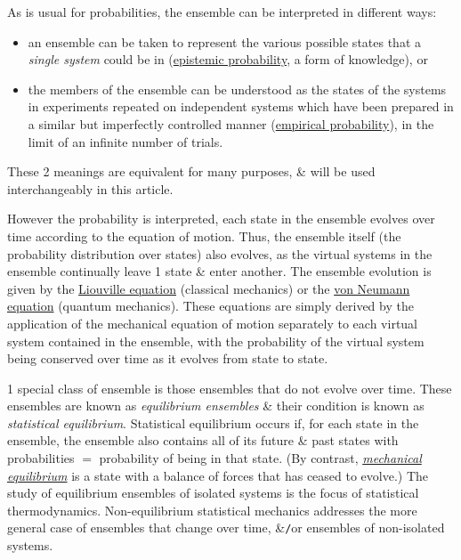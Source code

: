 \documentclass{article}
\begin{document}
As is usual for probabilities, the ensemble can be interpreted in different ways:
\begin{itemize}
	\item an ensemble can be taken to represent the various possible states that a {\it single system} could be in (\href{https://en.wikipedia.org/wiki/Epistemic_probability}{epistemic probability}, a form of knowledge), or
	\item the members of the ensemble can be understood as the states of the systems in experiments repeated on independent systems which have been prepared in a similar but imperfectly controlled manner (\href{https://en.wikipedia.org/wiki/Empirical_probability}{empirical probability}), in the limit of an infinite number of trials.
\end{itemize}
These 2 meanings are equivalent for many purposes, \& will be used interchangeably in this article.

However the probability is interpreted, each state in the ensemble evolves over time according to the equation of motion. Thus, the ensemble itself (the probability distribution over states) also evolves, as the virtual systems in the ensemble continually leave 1 state \& enter another. The ensemble evolution is given by the \href{https://en.wikipedia.org/wiki/Liouville%27s_theorem_(Hamiltonian)}{Liouville equation} (classical mechanics) or the \href{https://en.wikipedia.org/wiki/Von_Neumann_equation}{von Neumann equation} (quantum mechanics). These equations are simply derived by the application of the mechanical equation of motion separately to each virtual system contained in the ensemble, with the probability of the virtual system being conserved over time as it evolves from state to state.

1 special class of ensemble is those ensembles that do not evolve over time. These ensembles are known as {\it equilibrium ensembles} \& their condition is known as {\it statistical equilibrium}. Statistical equilibrium occurs if, for each state in the ensemble, the ensemble also contains all of its future \& past states with probabilities $=$ probability of being in that state. (By contrast, \href{https://en.wikipedia.org/wiki/Mechanical_equilibrium}{\it mechanical equilibrium} is a state with a balance of forces that has ceased to evolve.) The study of equilibrium ensembles of isolated systems is the focus of statistical thermodynamics. Non-equilibrium statistical mechanics addresses the more general case of ensembles that change over time, \&{\tt/}or ensembles of non-isolated systems.
\end{document}
